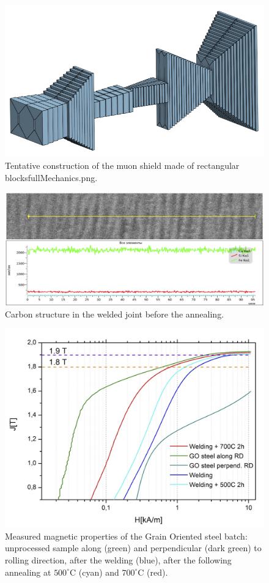 \documentclass{article}
\begin{document}
\begin{figure}[thbp]
\centering
\includegraphics[width=0.7\columnwidth]{figs/fullMechanics.png}
\caption{Tentative construction of the muon shield made of rectangular blocksfullMechanics.png.}
\label{fig:fullMechanics}
\end{figure}

\begin{figure}[thbp]
\centering
\includegraphics[width=0.7\columnwidth]{figs/carbon_structure.png}
\caption{Carbon structure in the welded joint before the annealing.}
\label{fig:goCarbonStructure}
\end{figure}

\begin{figure}[thbp]
\centering
\includegraphics[width=0.6\columnwidth]{figs/go_steel_annealing.png}
\caption{Measured magnetic properties of the Grain Oriented steel batch: unprocessed sample along (green) and perpendicular (dark green) to rolling direction,
after the welding (blue), after the following annealing at $500^\circ$C (cyan) and $700^\circ$C (red).}
\label{fig:goSteelAnnealing}
\end{figure}
\end{document}
